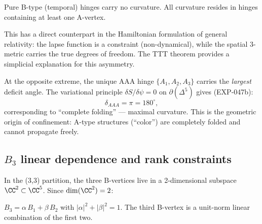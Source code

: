 \begin{corollary}
Pure B-type (temporal) hinges carry no curvature.  All curvature resides in hinges containing at least one A-vertex.
\end{corollary}

\begin{remark}
This has a direct counterpart in the Hamiltonian formulation of general relativity: the lapse function is a constraint (non-dynamical), while the spatial 3-metric carries the true degrees of freedom.  The TTT theorem provides a simplicial explanation for this asymmetry.
\end{remark}

At the opposite extreme, the unique AAA hinge $\{A_1, A_2, A_3\}$ carries the \emph{largest} deficit angle.  The variational principle $\delta S/\delta\psi = 0$ on $\partial(\Delta^5)$ gives (EXP-047b):
\begin{equation}
\delta_{AAA} = \pi = 180^\circ,
\end{equation}
corresponding to ``complete folding'' --- maximal curvature.  This is the geometric origin of confinement: A-type structures (``color'') are completely folded and cannot propagate freely.

\subsection{$B_3$ linear dependence and rank constraints}
\label{sec:B3_dependence}

In the (3,3) partition, the three B-vertices live in a 2-dimensional subspace $\CC^2 \subset \CC^5$.  Since $\dim(\CC^2) = 2$:

\begin{proposition}[$B_3$ dependence]
\label{prop:B3}
$B_3 = \alpha\, B_1 + \beta\, B_2$ with $|\alpha|^2 + |\beta|^2 = 1$.  The third B-vertex is a unit-norm linear combination of the first two.
\end{proposition}

